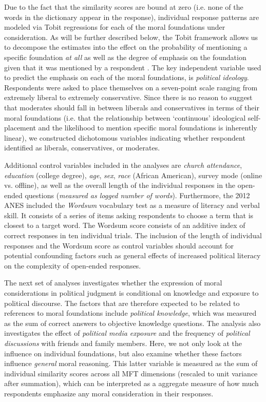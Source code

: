 \documentclass[12pt]{article}
\begin{document}
Due to the fact that the similarity scores are bound at zero (i.e. none of the words in the dictionary appear in the response), individual response patterns are modeled via Tobit regressions for each of the moral foundations under consideration. As will be further described below, the Tobit framework allows us to decompose the estimates into the effect on the probability of mentioning a specific foundation \textit{at all} as well as the degree of emphasis on the foundation given that it was mentioned by a respondent \citep[see][for details on the decomposition of Tobit model estimates]{mcdonald1980uses}. The key independent variable used to predict the emphasis on each of the moral foundations, is \textit{political ideology}. Respondents were asked to place themselves on a seven-point scale ranging from extremely liberal to extremely conservative. Since there is no reason to suggest that moderates should fall in between liberals and conservatives in terms of their moral foundations (i.e. that the relationship between `continuous' ideological self-placement and the likelihood to mention specific moral foundations is inherently linear), we constructed dichotomous variables indicating whether respondent identified as liberals, conservatives, or moderates.

Additional control variables included in the analyses are \textit{church attendance}, \textit{education} (college degree), \textit{age}, \textit{sex}, \textit{race} (African American), survey mode (online vs. offline), as well as the overall length of the individual responses in the open-ended questions (\textit{measured as logged number of words}). Furthermore, the 2012 ANES included the \textit{Wordsum} vocabulary test as a measure of literacy and verbal skill. It consists of a series of items asking respondents to choose a term that is closest to a target word. The Wordsum score consists of an additive index of correct responses in ten individual trials. The inclusion of the length of individual responses and the Wordsum score as control variables should account for potential confounding factors such as general effects of increased political literacy on the complexity of open-ended responses.

The next set of analyses investigates whether the expression of moral considerations in political judgment is conditional on knowledge and exposure to political discourse. The factors that are therefore expected to be related to references to moral foundations include \textit{political knowledge}, which was measured as the sum of correct answers to objective knowledge questions. The analysis also investigates the effect of \textit{political media exposure} and the frequency of \textit{political discussions} with friends and family members. Here, we not only look at the influence on individual foundations, but also examine whether these factors influence \textit{general} moral reasoning. This latter variable is measured as the sum of individual similarity scores across all MFT dimensions (rescaled to unit variance after summation), which can be interpreted as a aggregate measure of how much respondents emphasize any moral consideration in their responses.
\end{document}
